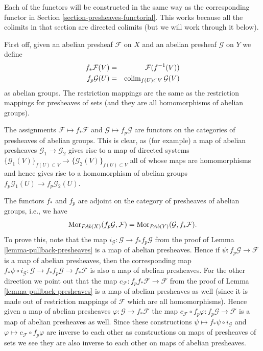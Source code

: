 \medskip\noindent
Each of the functors will be constructed in the same
way as the corresponding functor in
Section \ref{section-presheaves-functorial}.
This works because all the colimits in that section
are directed colimits (but we will work through it below).

\medskip\noindent
First off, given an abelian presheaf $\mathcal{F}$ on $X$ and
an abelian presheaf $\mathcal{G}$ on $Y$ we define
\begin{eqnarray*}
f_*\mathcal{F}(V) & = & \mathcal{F}(f^{-1}(V)) \\
f_p\mathcal{G}(U) & = & \mathop{\mathrm{colim}}\nolimits_{f(U) \subset V} \mathcal{G}(V)
\end{eqnarray*}
as abelian groups. The restriction mappings are the same as
the restriction mappings for presheaves of sets (and they are
all homomorphisms of abelian groups).

\medskip\noindent
The assignments $\mathcal{F} \mapsto f_*\mathcal{F}$ and
$\mathcal{G} \mapsto f_p\mathcal{G}$ are functors on
the categories of presheaves of abelian groups.
This is clear, as (for example) a map of abelian presheaves
$\mathcal{G}_1 \to \mathcal{G}_2$ gives rise to a map of
directed systems
$\{\mathcal{G}_1(V)\}_{f(U) \subset V} \to
\{\mathcal{G}_2(V)\}_{f(U) \subset V}$
all of whose maps are homomorphisms
and hence gives rise to a homomorphism of abelian groups
$f_p\mathcal{G}_1(U) \to f_p\mathcal{G}_2(U)$.

\medskip\noindent
The functors $f_*$ and $f_p$ are adjoint on the
category of presheaves of abelian groups, i.e., we have
$$
\mathop{\mathrm{Mor}}\nolimits_{\textit{PAb}(X)}(f_p\mathcal{G}, \mathcal{F})
=
\mathop{\mathrm{Mor}}\nolimits_{\textit{PAb}(Y)}(\mathcal{G}, f_*\mathcal{F}).
$$
To prove this, note that the map
$i_\mathcal{G} : \mathcal{G} \to f_* f_p\mathcal{G}$ from the proof
of Lemma \ref{lemma-pullback-presheaves}
is a map of abelian presheaves. Hence if
$\psi : f_p\mathcal{G} \to \mathcal{F}$
is a map of abelian presheaves, then the corresponding map
$f_*\psi \circ i_\mathcal{G} :
\mathcal{G} \to f_* f_p \mathcal{G} \to f_* \mathcal{F}$
is also a map of abelian presheaves. For the other direction
we point out that the map
$c_\mathcal{F} : f_p f_* \mathcal{F} \to \mathcal{F}$
from the proof of Lemma \ref{lemma-pullback-presheaves} is a
map of abelian presheaves as well (since it is made out of restriction
mappings of $\mathcal{F}$ which are all homomorphisms). Hence
given a map of abelian presheaves $\varphi : \mathcal{G} \to f_*\mathcal{F}$
the map
$c_\mathcal{F} \circ f_p\varphi : f_p\mathcal{G} \to \mathcal{F}$
is a map of abelian presheaves as well. Since these constructions
$\psi \mapsto f_*\psi \circ i_\mathcal{G}$ and $\varphi \mapsto c_\mathcal{F} \circ f_p\varphi$
are inverse to each other as constructions on maps of presheaves of sets
we see they are also inverse to each other on maps of abelian presheaves.

